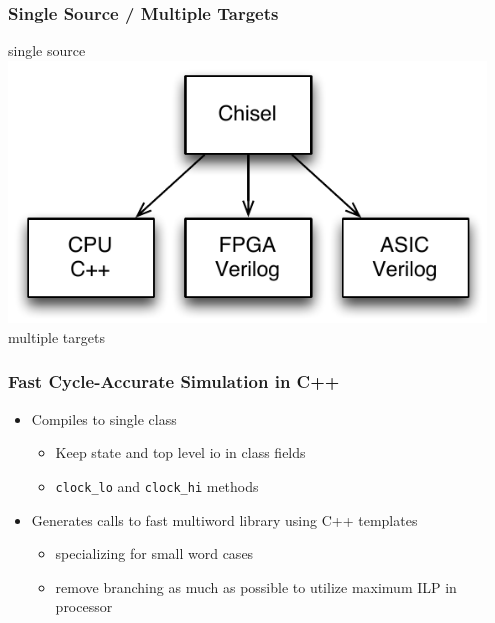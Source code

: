 \documentclass[xcolor=pdflatex,dvipsnames,table]{beamer}
\begin{document}
\ifx\poster\undefined
\begin{frame}[fragile]
\frametitle{Single Source / Multiple Targets}

\begin{center}
single source \\
\includegraphics[width=0.95\textwidth]{./figs/targets.pdf} \\
multiple targets \
\end{center}

\end{frame}
\fi

\begin{frame}[fragile]
\frametitle{Fast Cycle-Accurate Simulation in C++}

\begin{itemize}
\item Compiles to single class 
\begin{itemize}
\item Keep state and top level io in class fields
\item \verb+clock_lo+ and \verb+clock_hi+ methods
\end{itemize}
\item Generates calls to fast multiword library using C++ templates 
\begin{itemize}
\item specializing for small word cases
\item remove branching as much as possible to utilize maximum ILP in processor
\end{itemize}
\end{itemize}

\end{frame}
\end{document}
